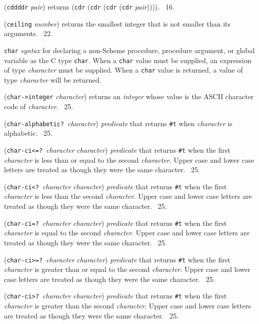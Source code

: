 \documentclass[10pt,twocolumn]{article}
\begin{document}
(\texttt{cddddr} \emph{pair}) returns (\texttt{cdr} (\texttt{cdr}
(\texttt{cdr} (\texttt{cdr} \emph{pair})))).  \RRRRRS~16.

(\texttt{ceiling} \emph{number}) returns the smallest integer that is
not smaller than its arguments.  \RRRRRS~22.

\texttt{char} \emph{syntax} for declaring a non-Scheme procedure,
procedure argument, or global variable as the C type \texttt{char}.
When a \texttt{char} value must be supplied, an expression of type
\emph{character} must be supplied.  When a \texttt{char} value is
returned, a value of type \emph{character} will be returned.

(\texttt{char->integer} \emph{character}) returns an \emph{integer}
whose value is the ASCII character code of \emph{character}.
\RRRRRS~25.

(\texttt{char-alphabetic?}\ \emph{character}) \emph{predicate} that
returns \texttt{\#t} when \emph{character} is alphabetic.  \RRRRRS~25.

(\texttt{char-ci<=?}\ \emph{character} \emph{character})
\emph{predicate} that returns \texttt{\#t} when the first
\emph{character} is less than or equal to the second \emph{character}.
Upper case and lower case letters are treated as though they were the
same character.  \RRRRRS~25.

(\texttt{char-ci<?}\ \emph{character} \emph{character})
\emph{predicate} that returns \texttt{\#t} when the first
\emph{character} is less than the second \emph{character}.  Upper case
and lower case letters are treated as though they were the same
character. \RRRRRS~25.

(\texttt{char-ci=?}\ \emph{character} \emph{character})
\emph{predicate} that returns \texttt{\#t} when the first
\emph{character} is equal to the second \emph{character}. Upper case
and lower case letters are treated as though they were the same
character.  \RRRRRS~25.

(\texttt{char-ci>=?}\ \emph{character} \emph{character})
\emph{predicate} that returns \texttt{\#t} when the first
\emph{character} is greater than or equal to the second
\emph{character}. Upper case and lower case letters are treated as
though they were the same character. \RRRRRS~25.

(\texttt{char-ci>?}\ \emph{character} \emph{character})
\emph{predicate} that returns \texttt{\#t} when the first
\emph{character} is greater than the second \emph{character}. Upper
case and lower case letters are treated as though they were the same
character. \RRRRRS~25.
\end{document}
